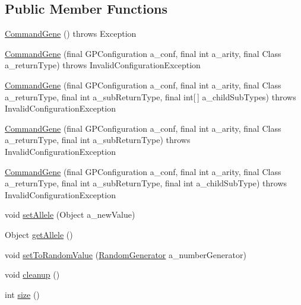 \subsection*{Public Member Functions}
\begin{DoxyCompactItemize}
\item 
\hyperlink{classorg_1_1jgap_1_1gp_1_1_command_gene_a4db8d60219c7a6321e1cedf6314091e8}{Command\-Gene} ()  throws Exception 
\item 
\hyperlink{classorg_1_1jgap_1_1gp_1_1_command_gene_acde008eb16a780d2e933f8c48703da1c}{Command\-Gene} (final G\-P\-Configuration a\-\_\-conf, final int a\-\_\-arity, final Class a\-\_\-return\-Type)  throws Invalid\-Configuration\-Exception 
\item 
\hyperlink{classorg_1_1jgap_1_1gp_1_1_command_gene_a50cbf3716df846faa00e274e557e30a1}{Command\-Gene} (final G\-P\-Configuration a\-\_\-conf, final int a\-\_\-arity, final Class a\-\_\-return\-Type, final int a\-\_\-sub\-Return\-Type, final int\mbox{[}$\,$\mbox{]} a\-\_\-child\-Sub\-Types)  throws Invalid\-Configuration\-Exception 
\item 
\hyperlink{classorg_1_1jgap_1_1gp_1_1_command_gene_af6e4074e2f026bcc69186e35af245f9e}{Command\-Gene} (final G\-P\-Configuration a\-\_\-conf, final int a\-\_\-arity, final Class a\-\_\-return\-Type, final int a\-\_\-sub\-Return\-Type)  throws Invalid\-Configuration\-Exception 
\item 
\hyperlink{classorg_1_1jgap_1_1gp_1_1_command_gene_a0f1dba8d326b40e3c4451a3f1999d957}{Command\-Gene} (final G\-P\-Configuration a\-\_\-conf, final int a\-\_\-arity, final Class a\-\_\-return\-Type, final int a\-\_\-sub\-Return\-Type, final int a\-\_\-child\-Sub\-Type)  throws Invalid\-Configuration\-Exception 
\item 
void \hyperlink{classorg_1_1jgap_1_1gp_1_1_command_gene_a45c9513c809672f45de49e184d12d183}{set\-Allele} (Object a\-\_\-new\-Value)
\item 
Object \hyperlink{classorg_1_1jgap_1_1gp_1_1_command_gene_aeed3e001c69516b1a9b45bcc8a16cd0e}{get\-Allele} ()
\item 
void \hyperlink{classorg_1_1jgap_1_1gp_1_1_command_gene_a0f4add0508f6d5643e6eb570177e7cbd}{set\-To\-Random\-Value} (\hyperlink{interfaceorg_1_1jgap_1_1_random_generator}{Random\-Generator} a\-\_\-number\-Generator)
\item 
void \hyperlink{classorg_1_1jgap_1_1gp_1_1_command_gene_a2cc458a0ec9413c20edf137234118f98}{cleanup} ()
\item 
int \hyperlink{classorg_1_1jgap_1_1gp_1_1_command_gene_abfcfdcce950bae1d2bbc6d7f5e3e788a}{size} ()

\end{DoxyCompactItemize}
